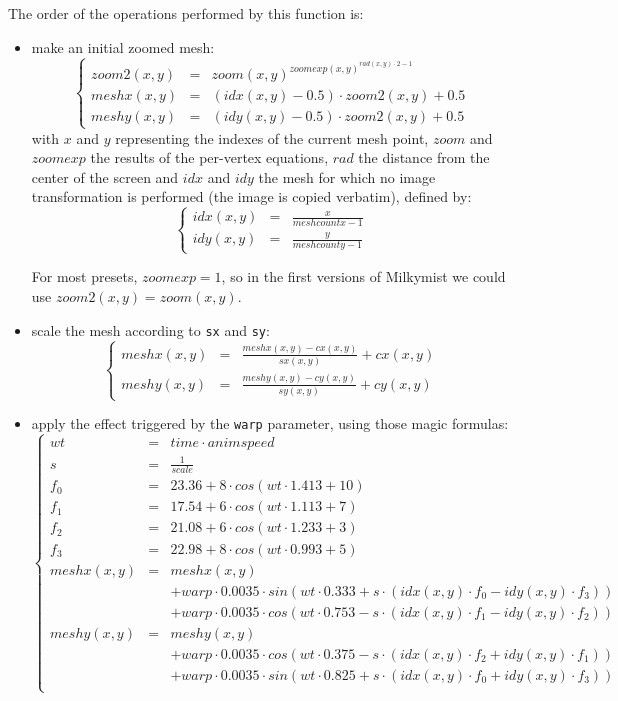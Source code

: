 \documentclass[a4paper,11pt]{article}
\begin{document}
The order of the operations performed by this function is:
\begin{itemize}
\item make an initial zoomed mesh:
\[
\left\{ \begin{array}{rrlr}
zoom2(x, y) & = & zoom(x, y)^{zoomexp(x, y)^{rad(x, y) \cdot 2 - 1}} \\
meshx(x, y) & = & ( idx(x, y) - 0.5) \cdot zoom2(x, y) + 0.5 \\
meshy(x, y) & = & ( idy(x, y) - 0.5) \cdot zoom2(x, y) + 0.5
\end{array}
\right.
\]
with $ x $ and $ y $ representing the indexes of the current mesh point, $ zoom $ and $ zoomexp $ the results of the per-vertex equations, $ rad $ the distance from the center of the screen and $ idx $ and $idy $ the mesh for which no image transformation is performed (the image is copied verbatim), defined by:
\[
\left\{ \begin{array}{rrlr}
idx(x, y) & = & \frac{x}{meshcountx-1} \\
idy(x, y) & = & \frac{y}{meshcounty-1}
\end{array}
\right.
\]

For most presets, $ zoomexp = 1 $, so in the first versions of Milkymist we could use $ zoom2(x, y) = zoom(x, y) $.

\item scale the mesh according to \verb!sx! and \verb!sy!:
\[
\left\{ \begin{array}{rrlr}
meshx(x, y) & = & \frac{meshx(x, y) - cx(x, y)}{sx(x, y)} + cx(x, y)\\
meshy(x, y) & = & \frac{meshy(x, y) - cy(x, y)}{sy(x, y)} + cy(x, y)
\end{array}
\right.
\]

\item apply the effect triggered by the \verb!warp! parameter, using those magic formulas:
\[
\left\{ \begin{array}{rrlr}
wt & = & time \cdot animspeed \\
s & = & \frac{1}{scale} \\
f_0 & = & 23.36 + 8 \cdot cos(wt \cdot 1.413 + 10) \\
f_1 & = & 17.54 + 6 \cdot cos(wt \cdot 1.113 + 7) \\
f_2 & = & 21.08 + 6 \cdot cos(wt \cdot 1.233 + 3) \\
f_3 & = & 22.98 + 8 \cdot cos(wt \cdot 0.993 + 5) \\
meshx(x, y) & = & meshx(x, y) \\
 &  & + warp \cdot 0.0035 \cdot sin(wt \cdot 0.333 + s \cdot (idx(x, y) \cdot f_0 - idy(x, y) \cdot f_3)) \\
 &  & + warp \cdot 0.0035 \cdot cos(wt \cdot 0.753 - s \cdot (idx(x, y) \cdot f_1 - idy(x, y) \cdot f_2)) \\
meshy(x, y) & = & meshy(x, y) \\
 &  & + warp \cdot 0.0035 \cdot cos(wt \cdot 0.375 - s \cdot (idx(x, y) \cdot f_2 + idy(x, y) \cdot f_1)) \\
 &  & + warp \cdot 0.0035 \cdot sin(wt \cdot 0.825 + s \cdot (idx(x, y) \cdot f_0 + idy(x, y) \cdot f_3)) \\
\end{array}
\right.
\]


\end{itemize}
\end{document}

